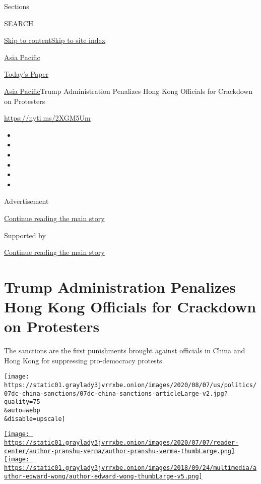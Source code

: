 Sections

SEARCH

\protect\hyperlink{site-content}{Skip to
content}\protect\hyperlink{site-index}{Skip to site index}

\href{https://www.nytimes3xbfgragh.onion/section/world/asia}{Asia
Pacific}

\href{https://myaccount.nytimes3xbfgragh.onion/auth/login?response_type=cookie\&client_id=vi}{}

\href{https://www.nytimes3xbfgragh.onion/section/todayspaper}{Today's
Paper}

\href{/section/world/asia}{Asia Pacific}\textbar{}Trump Administration
Penalizes Hong Kong Officials for Crackdown on Protesters

\href{https://nyti.ms/2XGM5Um}{https://nyti.ms/2XGM5Um}

\begin{itemize}
\item
\item
\item
\item
\item
\item
\end{itemize}

Advertisement

\protect\hyperlink{after-top}{Continue reading the main story}

Supported by

\protect\hyperlink{after-sponsor}{Continue reading the main story}

\hypertarget{trump-administration-penalizes-hong-kong-officials-for-crackdown-on-protesters}{%
\section{Trump Administration Penalizes Hong Kong Officials for
Crackdown on
Protesters}\label{trump-administration-penalizes-hong-kong-officials-for-crackdown-on-protesters}}

The sanctions are the first punishments brought against officials in
China and Hong Kong for suppressing pro-democracy protests.

\texttt{[image: https://static01.graylady3jvrrxbe.onion/images/2020/08/07/us/politics/07dc-china-sanctions/07dc-china-sanctions-articleLarge-v2.jpg?quality=75\\\&auto=webp\\\&disable=upscale]}

\href{https://www.nytimes3xbfgragh.onion/by/pranshu-verma}{\texttt{[image: https://static01.graylady3jvrrxbe.onion/images/2020/07/07/reader-center/author-pranshu-verma/author-pranshu-verma-thumbLarge.png]}}\href{https://www.nytimes3xbfgragh.onion/by/edward-wong}{\texttt{[image: https://static01.graylady3jvrrxbe.onion/images/2018/09/24/multimedia/author-edward-wong/author-edward-wong-thumbLarge-v5.png]}}

